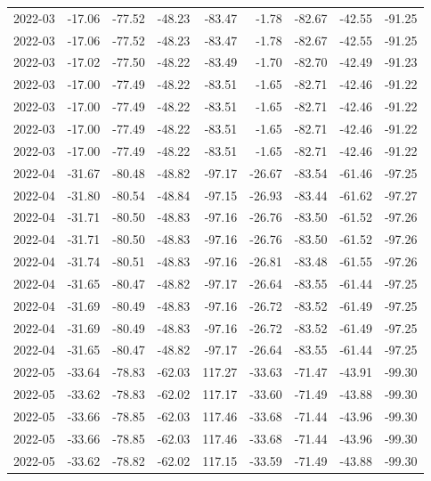 \begin{table}[ht]
\begin{tabular}{lrrrrrrrr}
  2022-03 & -17.06 & -77.52 & -48.23 & -83.47 & -1.78 & -82.67 & -42.55 & -91.25 \\ 
  2022-03 & -17.06 & -77.52 & -48.23 & -83.47 & -1.78 & -82.67 & -42.55 & -91.25 \\ 
  2022-03 & -17.02 & -77.50 & -48.22 & -83.49 & -1.70 & -82.70 & -42.49 & -91.23 \\ 
  2022-03 & -17.00 & -77.49 & -48.22 & -83.51 & -1.65 & -82.71 & -42.46 & -91.22 \\ 
  2022-03 & -17.00 & -77.49 & -48.22 & -83.51 & -1.65 & -82.71 & -42.46 & -91.22 \\ 
  2022-03 & -17.00 & -77.49 & -48.22 & -83.51 & -1.65 & -82.71 & -42.46 & -91.22 \\ 
  2022-03 & -17.00 & -77.49 & -48.22 & -83.51 & -1.65 & -82.71 & -42.46 & -91.22 \\ 
  2022-04 & -31.67 & -80.48 & -48.82 & -97.17 & -26.67 & -83.54 & -61.46 & -97.25 \\ 
  2022-04 & -31.80 & -80.54 & -48.84 & -97.15 & -26.93 & -83.44 & -61.62 & -97.27 \\ 
  2022-04 & -31.71 & -80.50 & -48.83 & -97.16 & -26.76 & -83.50 & -61.52 & -97.26 \\ 
  2022-04 & -31.71 & -80.50 & -48.83 & -97.16 & -26.76 & -83.50 & -61.52 & -97.26 \\ 
  2022-04 & -31.74 & -80.51 & -48.83 & -97.16 & -26.81 & -83.48 & -61.55 & -97.26 \\ 
  2022-04 & -31.65 & -80.47 & -48.82 & -97.17 & -26.64 & -83.55 & -61.44 & -97.25 \\ 
  2022-04 & -31.69 & -80.49 & -48.83 & -97.16 & -26.72 & -83.52 & -61.49 & -97.25 \\ 
  2022-04 & -31.69 & -80.49 & -48.83 & -97.16 & -26.72 & -83.52 & -61.49 & -97.25 \\ 
  2022-04 & -31.65 & -80.47 & -48.82 & -97.17 & -26.64 & -83.55 & -61.44 & -97.25 \\ 
  2022-05 & -33.64 & -78.83 & -62.03 & 117.27 & -33.63 & -71.47 & -43.91 & -99.30 \\ 
  2022-05 & -33.62 & -78.83 & -62.02 & 117.17 & -33.60 & -71.49 & -43.88 & -99.30 \\ 
  2022-05 & -33.66 & -78.85 & -62.03 & 117.46 & -33.68 & -71.44 & -43.96 & -99.30 \\ 
  2022-05 & -33.66 & -78.85 & -62.03 & 117.46 & -33.68 & -71.44 & -43.96 & -99.30 \\ 
  2022-05 & -33.62 & -78.82 & -62.02 & 117.15 & -33.59 & -71.49 & -43.88 & -99.30 \\ 

\end{tabular}
\end{table}
